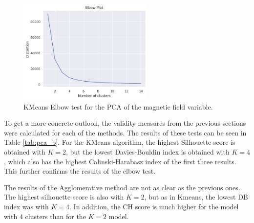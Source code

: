 \begin{figure}
    \caption{KMeans Elbow test for the PCA of the magnetic field variable.}
    \label{fig:pca_b_elbow}
    \centering
    \includegraphics[width=0.6\textwidth]{figures/pca_mag_elbow_test.png}
\end{figure}

To get a more concrete outlook, the validity measures from the previous sections were calculated for each of the methods. The results of these tests can be seen in Table \ref{tab:pca_b}. For the KMeans algorithm, the highest Silhouette score is obtained with $K=2$, but the lowest Davies-Bouldin index is obtained with $K=4$, which also has the highest Calinski-Harabasz index of the first three results. This further confirms the results of the elbow test. 

The results of the Agglomerative method are not as clear as the previous ones. The highest silhouette score is also with $K=2$, but as in Kmeans, the lowest DB index was with $K=4$. In addition, the CH score is much higher for the model with 4 clusters than for the $K=2$ model.


